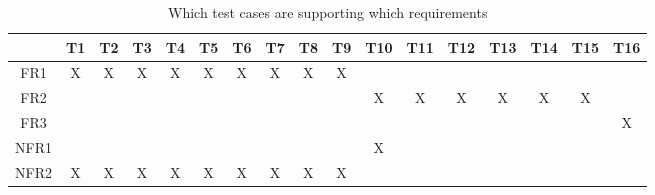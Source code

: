 
\begin{table}[H]
\centering
\begin{tabular}{|c|c|c|c|c|c|c|c|c|c|c|c|c|c|c|c|c|}
\hline
	& T1 & T2 & T3 & T4 & T5 & T6 & T7 & T8 & T9 & T10 & T11 & T12 & T13 & T14 & T15 & T16\\
\hline
FR1  &X&X&X&X&X&X&X&X&X& & & & & & & \\ \hline
FR2  & & & & & & & & & &X&X&X&X&X&X& \\ \hline
FR3  & & & & & & & & & & & & & & & &X\\ \hline
NFR1 & & & & & & & & & &X& & & & & & \\ \hline
NFR2 &X&X&X&X&X&X&X&X&X& & & & & & & \\ \hline
\end{tabular}
\caption{Which test cases are supporting which requirements}
\label{Table:test_support}
\end{table}
